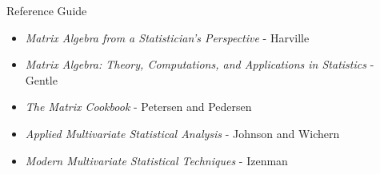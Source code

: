 \documentclass{beamer}
\begin{document}
\begin{frame}{Reference Guide}
\begin{itemize}
\item{\emph{Matrix Algebra from a Statistician's Perspective} - Harville}
\item{\emph{Matrix Algebra: Theory, Computations, and Applications in Statistics} - Gentle}
\item{\emph{The Matrix Cookbook} - Petersen and Pedersen}
\item{\emph{Applied Multivariate Statistical Analysis} - Johnson and Wichern}
\item{\emph{Modern Multivariate Statistical Techniques} - Izenman}
\end{itemize}
\end{frame}
\end{document}
